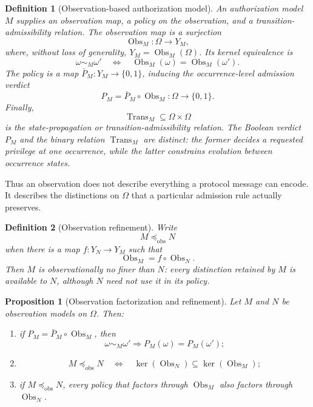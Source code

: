 \documentclass[10pt,twocolumn]{article}
\newtheorem{definition}{Definition}
\newtheorem{proposition}{Proposition}
\begin{document}
\begin{definition}[Observation-based authorization model]
An authorization model \(M\) supplies an observation map, a policy on the
observation, and a transition-admissibility relation. The observation map is a
surjection
\[
\operatorname{Obs}_M:\Omega\longrightarrow Y_M,
\]
where, without loss of generality, \(Y_M=\operatorname{Obs}_M(\Omega)\). Its
kernel equivalence is
\[
\omega\sim_M\omega'
\quad\Longleftrightarrow\quad
\operatorname{Obs}_M(\omega)=\operatorname{Obs}_M(\omega').
\]
The policy is a map \(\bar P_M:Y_M\to\{0,1\}\), inducing the occurrence-level
admission verdict
\[
P_M=\bar P_M\circ\operatorname{Obs}_M
\colon\Omega\longrightarrow\{0,1\}.
\]
Finally,
\[
\operatorname{Trans}_M\subseteq\Omega\times\Omega
\]
is the state-propagation or transition-admissibility relation. The Boolean
verdict \(P_M\) and the binary relation \(\operatorname{Trans}_M\) are distinct:
the former decides a requested privilege at one occurrence, while the latter
constrains evolution between occurrence states.
\end{definition}

Thus an observation does not describe everything a protocol message can encode.
It describes the distinctions on \(\Omega\) that a particular admission rule
actually preserves.

\begin{definition}[Observation refinement]
Write
\[
M\preceq_{\mathrm{obs}}N
\]
when there is a map \(f:Y_N\to Y_M\) such that
\[
\operatorname{Obs}_M=f\circ\operatorname{Obs}_N.
\]
Then \(M\) is observationally no finer than \(N\): every distinction retained
by \(M\) is available to \(N\), although \(N\) need not use it in its policy.
\end{definition}

\begin{proposition}[Observation factorization and refinement]
\label{prop:observation-refinement}
Let \(M\) and \(N\) be observation models on \(\Omega\). Then:
\begin{enumerate}
    \item if \(P_M=\bar P_M\circ\operatorname{Obs}_M\), then
    \[
    \omega\sim_M\omega'\Longrightarrow P_M(\omega)=P_M(\omega');
    \]
    \item
    \[
    M\preceq_{\mathrm{obs}}N
    \quad\Longleftrightarrow\quad
    \ker(\operatorname{Obs}_N)
    \subseteq
    \ker(\operatorname{Obs}_M);
    \]
    \item if \(M\preceq_{\mathrm{obs}}N\), every policy that factors through
    \(\operatorname{Obs}_M\) also factors through
    \(\operatorname{Obs}_N\).
\end{enumerate}
\end{proposition}
\end{document}
